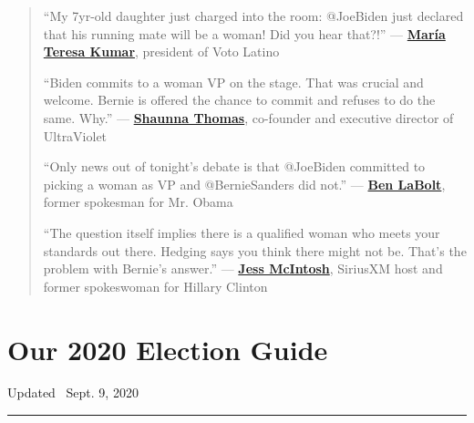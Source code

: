 \begin{quote}
``My 7yr-old daughter just charged into the room: @JoeBiden just
declared that his running mate will be a woman! Did you hear that?!''
---
\textbf{\href{https://twitter.com/MariaTeresa1/status/1239358896071942144}{María
Teresa Kumar}}, president of Voto Latino

``Biden commits to a woman VP on the stage. That was crucial and
welcome. Bernie is offered the chance to commit and refuses to do the
same. Why.'' ---
\textbf{\href{https://twitter.com/SLThomas/status/1239358370299117569}{Shaunna
Thomas}}, co-founder and executive director of UltraViolet

``Only news out of tonight's debate is that @JoeBiden committed to
picking a woman as VP and @BernieSanders did not.'' ---
\textbf{\href{https://twitter.com/BenLaBolt/status/1239359314701086721}{Ben
LaBolt}}, former spokesman for Mr. Obama

``The question itself implies there is a qualified woman who meets your
standards out there. Hedging says you think there might not be. That's
the problem with Bernie's answer.'' ---
\textbf{\href{https://twitter.com/jess_mc/status/1239362402887630848}{Jess
McIntosh}}, SiriusXM host and former spokeswoman for Hillary Clinton
\end{quote}

\hypertarget{our-2020-election-guide}{%
\section{Our 2020 Election Guide}\label{our-2020-election-guide}}

Updated ~Sept. 9, 2020

\begin{center}\rule{0.5\linewidth}{\linethickness}\end{center}


